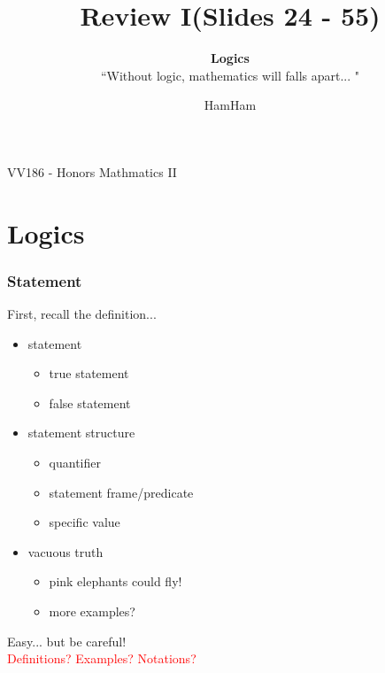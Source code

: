 \documentclass{beamer}
\title{\sffamily Review I(Slides 24 - 55)}
\subtitle{\textbf{Logics}\\``Without logic, mathematics will falls apart... "}
\institute[UM-SJTU JI]{University of Michigan-Shanghai Jiao Tong University Joint Institute}
\author{HamHam}
\newcommand{\myfont}{\rmfamily\normalsize\upshape\mdseries}
\begin{document}
\begin{titlepage}
    \begin{center}
        VV186 - Honors Mathmatics II
    \end{center}
\end{titlepage}
\myfont
\section{Logics}
\begin{frame}
    \frametitle{Statement}
        First, recall the definition...
        \vspace*{1em}
        \begin{itemize}
            \item statement
            \begin{itemize}
                \item true statement 
                \item false statement
            \end{itemize}
            \item statement structure
            \begin{itemize}
                \item quantifier
                \item statement frame/predicate
                \item specific value
            \end{itemize}
            \item vacuous truth
                \begin{itemize}
                    \item pink elephants could fly!
                    \item more examples?
                \end{itemize}
        \end{itemize}
        \vspace*{1em}
        \myfont
        Easy... but be careful! \\
        \textcolor{red}{Definitions? Examples? Notations?}
\end{frame}
\end{document}
